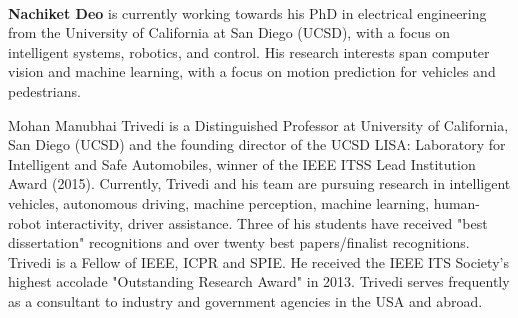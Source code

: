 \documentclass[journal]{IEEEtran}
\begin{document}
\ifCLASSOPTIONcaptionsoff
  \newpage
\fi








\vspace{-0.4in}
\begin{IEEEbiography}\\\textbf{Nachiket Deo}
is currently working towards his PhD in electrical engineering from the University of California at San Diego (UCSD), with a focus on intelligent systems, robotics, and control. His research interests span computer vision and machine learning, with a focus on motion prediction for vehicles and pedestrians.
\end{IEEEbiography}
\vspace{-0.5in}
\begin{IEEEbiography}{Mohan Manubhai Trivedi}
is a Distinguished Professor at University of California, San Diego (UCSD) and the founding director of the UCSD LISA: Laboratory for Intelligent and Safe Automobiles,
winner of the IEEE ITSS Lead Institution Award (2015). Currently, Trivedi and his team
are pursuing research in intelligent vehicles, autonomous driving, machine perception, machine learning, human-robot interactivity, driver assistance. Three of his students have received "best dissertation" recognitions and over twenty best papers/finalist recognitions. Trivedi is a Fellow of IEEE, ICPR and SPIE. He received the IEEE ITS Society's highest accolade "Outstanding Research Award" in 2013. Trivedi serves frequently as a consultant to industry and government agencies in the USA and abroad. 
\end{IEEEbiography}
\end{document}
